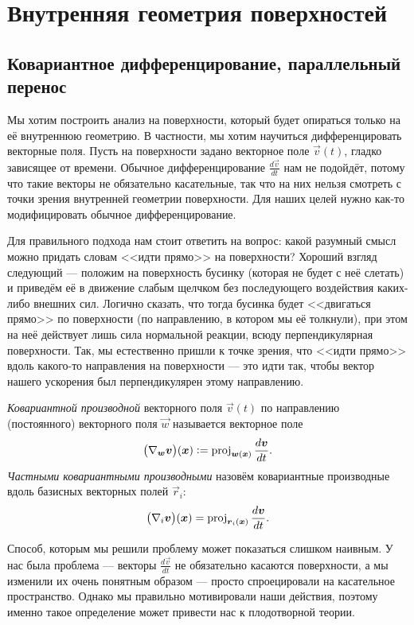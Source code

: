 \section{Внутренняя геометрия поверхностей}

\subsection{Ковариантное дифференцирование, параллельный перенос}

Мы хотим построить анализ на поверхности, который будет опираться только на её внутреннюю геометрию. В частности, мы хотим научиться дифференцировать векторные поля. Пусть на поверхности задано векторное поле $\vec{v}(t)$, гладко зависящее от времени. Обычное дифференцирование $\frac{d\vec{v}}{dt}$ нам не подойдёт, потому что такие векторы не обязательно касательные, так что на них нельзя смотреть с точки зрения внутренней геометрии поверхности. Для наших целей нужно как-то модифицировать обычное дифференцирование.

Для правильного подхода нам стоит ответить на вопрос: какой разумный смысл можно придать словам <<идти прямо>> на поверхности? Хороший взгляд следующий --- положим на поверхность бусинку (которая не будет с неё слетать) и приведём её в движение слабым щелчком без последующего воздействия каких-либо внешних сил. Логично сказать, что тогда бусинка будет <<двигаться прямо>> по поверхности (по направлению, в котором мы её толкнули), при этом на неё действует лишь сила нормальной реакции, всюду перпендикулярная поверхности.  Так, мы естественно пришли к точке зрения, что <<идти прямо>> вдоль какого-то направления на поверхности --- это идти так, чтобы вектор нашего ускорения был перпендикулярен этому направлению.

\begin{definition}
	\textit{Ковариантной производной} векторного поля $\vec{v}(t)$ по направлению (постоянного) векторного поля $\vec{w}$ называется векторное поле
	\[
		\big(\nabla_{\boldsymbol{w}}\boldsymbol{v}\big)(\boldsymbol{x}) \vcentcolon = \operatorname{proj}_{\boldsymbol{w}(\boldsymbol{x})}\frac{d\boldsymbol{v}}{dt}.
	\]
	\textit{Частными ковариантными производными} назовём ковариантные производные вдоль базисных векторных полей $\vec{r}_i$:
	\[
		\big(\nabla_i\boldsymbol{v}\big)(\boldsymbol{x}) = \operatorname{proj}_{\boldsymbol{r}_i(\boldsymbol{x})}\frac{d\boldsymbol{v}}{dt}.
	\]
\end{definition}

Способ, которым мы решили проблему может показаться слишком наивным. У нас была проблема --- векторы $\frac{d\vec{v}}{dt}$ не обязательно касаются поверхности, а мы изменили их очень понятным образом --- просто спроецировали на касательное пространство. Однако мы правильно мотивировали наши действия, поэтому именно такое определение может привести нас к плодотворной теории.

